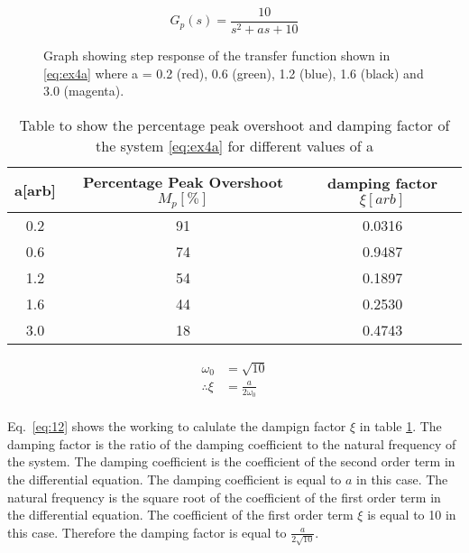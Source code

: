 \renewcommand{\ex}{ex4a}

\begin{equation}
	G_{p}\left(s\right)=\frac{10}{s^2 + as + 10}
	\label{eq:\ex}
\end{equation}


\begin{figure}[ht!]
	\centering
	
	\caption{Graph showing step response of the transfer function shown in \eqref{eq:\ex} where a = 0.2 (red), 0.6 (green), 1.2 (blue), 1.6 (black) and 3.0 (magenta). \appendixamble{\ex}}
	\label{fig:\ex}
\end{figure}\FloatBarrier


\begin{table}[ht!]
    \centering
    \begin{tabular}{|c|c|c|}
    \hline
    a{[}arb{]} & Percentage Peak Overshoot $M_p[\%]$ & damping factor $\xi[arb]$ \\ \hline
    0.2        & 91                                  & 0.0316                    \\ \hline
    0.6        & 74                                  & 0.9487                    \\ \hline
    1.2        & 54                                  & 0.1897                    \\ \hline
    1.6        & 44                                  & 0.2530                    \\ \hline
    3.0        & 18                                  & 0.4743                    \\ \hline
    \end{tabular}
    \caption{Table to show the percentage peak overshoot and damping factor of the system \eqref{eq:\ex} for different values of a}\label{table:\ex}
    \end{table}\FloatBarrier

    \begin{equation}
    \begin{split}
        \omega_0 &= \sqrt{10}\\
        \therefore \xi &= \frac{a}{2\omega_0}\\
    \end{split}\label{eq:12}
    \end{equation}

Eq.~\eqref{eq:12} shows the working to calulate the dampign factor $\xi$ in table \ref{table:\ex}. The damping factor is the ratio of the damping coefficient to the natural frequency of the system. The damping coefficient is the coefficient of the second order term in the differential equation. The damping coefficient is equal to $a$ in this case. The natural frequency is the square root of the coefficient of the first order term in the differential equation. The coefficient of the first order term  $\xi$ is equal to 10 in this case. Therefore the damping factor is equal to $\frac{a}{2\sqrt{10}}$.

